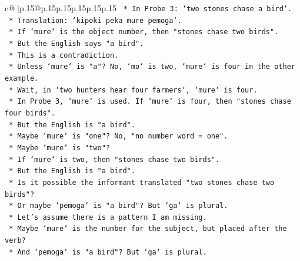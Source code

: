 \documentclass{article}
\begin{document}
{\begin{supertabular}{c@{$\;$}|p{.15\linewidth}@{}p{.15\linewidth}p{.15\linewidth}p{.15\linewidth}p{.15\linewidth}p{.15\linewidth}}
{{{\texttt{                                            *   In Probe 3: `two stones chase a bird`.} \\
\texttt{                                            *   Translation: `kipoki peka mure pemoga`.} \\
\texttt{                                            *   If `mure` is the object number, then "stones chase two birds".} \\
\texttt{                                            *   But the English says "a bird".} \\
\texttt{                                            *   This is a contradiction.} \\
\texttt{                                            *   Unless `mure` is "a"? No, `mo` is two, `mure` is four in the other example.} \\
\texttt{                                            *   Wait, in `two hunters hear four farmers`, `mure` is four.} \\
\texttt{                                            *   In Probe 3, `mure` is used. If `mure` is four, then "stones chase four birds".} \\
\texttt{                                            *   But the English is "a bird".} \\
\texttt{                                            *   Maybe `mure` is "one"? No, "no number word = one".} \\
\texttt{                                            *   Maybe `mure` is "two"?} \\
\texttt{                                            *   If `mure` is two, then "stones chase two birds".} \\
\texttt{                                            *   But the English is "a bird".} \\
\texttt{                                            *   Is it possible the informant translated "two stones chase two birds"?} \\
\texttt{                                            *   Or maybe `pemoga` is "a bird"? But `ga` is plural.} \\
\texttt{                                            *   Let's assume there is a pattern I am missing.} \\
\texttt{                                            *   Maybe `mure` is the number for the subject, but placed after the verb?} \\
\texttt{                                            *   And `pemoga` is "a bird"? But `ga` is plural.} \\
}}}
\end{supertabular}}
\end{document}
